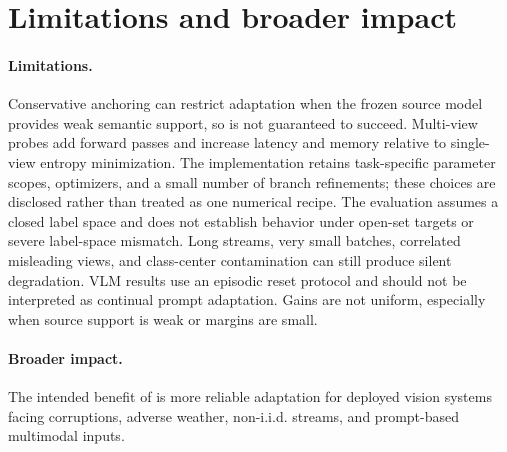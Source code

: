\section{Limitations and broader impact}

\paragraph{Limitations.}
Conservative anchoring can restrict adaptation when the frozen source model provides weak semantic support, so \method{} is not guaranteed to succeed. Multi-view probes add forward passes and increase latency and memory relative to single-view entropy minimization. The implementation retains task-specific parameter scopes, optimizers, and a small number of branch refinements; these choices are disclosed rather than treated as one numerical recipe. The evaluation assumes a closed label space and does not establish behavior under open-set targets or severe label-space mismatch. Long streams, very small batches, correlated misleading views, and class-center contamination can still produce silent degradation. VLM results use an episodic reset protocol and should not be interpreted as continual prompt adaptation. Gains are not uniform, especially when source support is weak or margins are small.

\paragraph{Broader impact.}
The intended benefit of \method{} is more reliable adaptation for deployed vision systems facing corruptions, adverse weather, non-i.i.d. streams, and prompt-based multimodal inputs.
